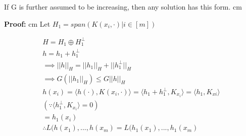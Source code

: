 \documentclass{article}
\begin{document}
			If G is further assumed to be increasing, then any solution has this form. 
			 cm
			
			\textbf{Proof:}
			 cm
			Let $H_{1}= span(K(x_{i},\cdot)|i \in [m])$
			
			\begin{align}
			H=H_1\oplus H_{1}^{\perp}\\ \nonumber	
			h=h_{1}+h_{1}^{\perp} \\ \nonumber
			\implies ||h||_{H}=||h_{1}||_{H} + ||h_{1}^{\perp}||_{H} \\ \nonumber
			\implies G(||h_{1}||_{H} ) \leq G||h||_{H} \\ \nonumber
			h(x_{i})= \langle h(\cdot), K(x_{i}, \cdot)\rangle = \langle h_{1}+h_{1}^{\perp}, K_{x_{i}}\rangle = \langle h_{1},K_{x{i}}\rangle   \\ \nonumber
			(\because \langle h_{1}^{\perp}, K_{x_{i}} \rangle=0)\\ \nonumber
			=h_{1}(x_{i})\\ \nonumber
			\therefore L(h(x_{1}),...,h(x_{m})= L(h_{1}(x_{1}),...,h_{1}(x_{m}) \nonumber
			\end{align}
			
		
\end{document}
